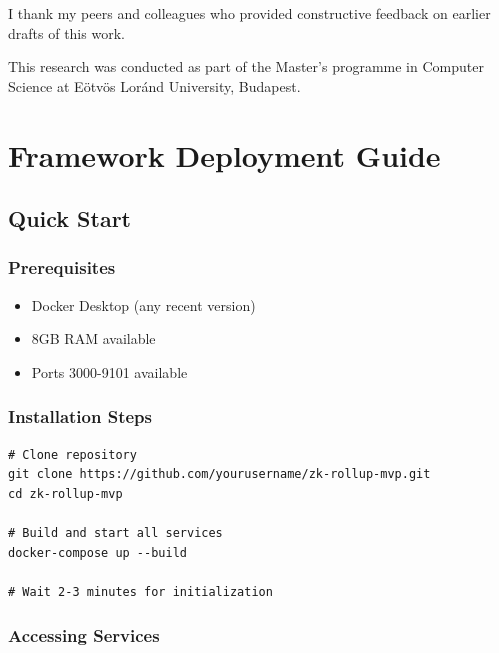 \documentclass[
]{elteikthesis}[2024/04/26]
\begin{document}
I thank my peers and colleagues who provided constructive feedback on earlier drafts of this work.

This research was conducted as part of the Master's programme in Computer Science at Eötvös Loránd University, Budapest.

\cleardoublepage

\appendix

\chapter{Framework Deployment Guide}
\label{app:deployment}

\section{Quick Start}

\subsection{Prerequisites}

\begin{itemize}
    \item Docker Desktop (any recent version)
    \item 8GB RAM available
    \item Ports 3000-9101 available
\end{itemize}

\subsection{Installation Steps}

\begin{listing}[H]
    \begin{verbatim}
# Clone repository
git clone https://github.com/yourusername/zk-rollup-mvp.git
cd zk-rollup-mvp

# Build and start all services
docker-compose up --build

# Wait 2-3 minutes for initialization
    \end{verbatim}
    \caption{Basic deployment commands}
    \label{lst:deploy-commands}
\end{listing}

\subsection{Accessing Services}
\end{document}
